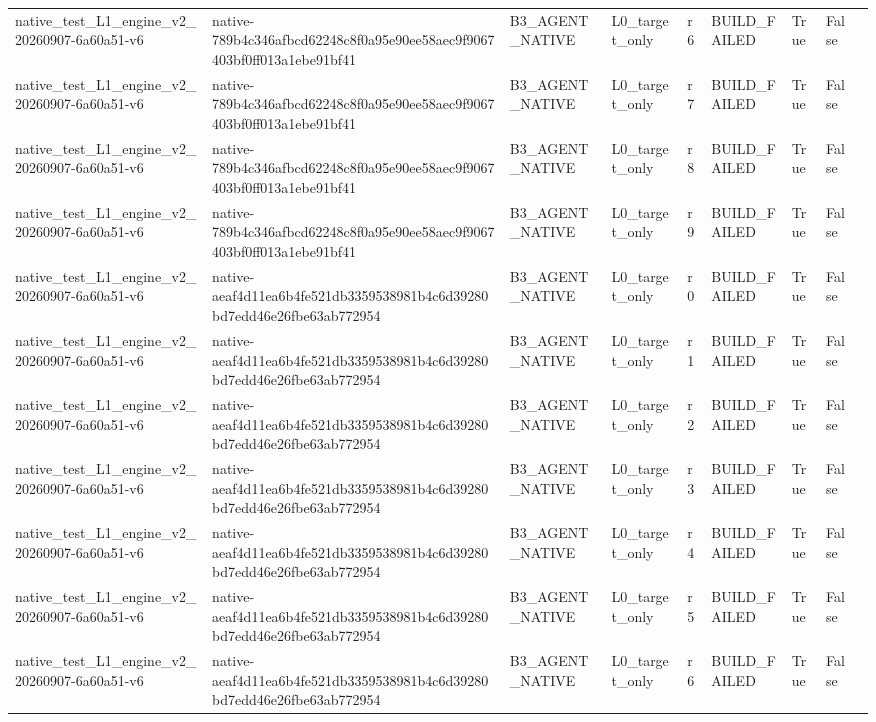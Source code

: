 \begin{tabular}{lllllllll}
native\_test\_L1\_engine\_v2\_20260907-6a60a51-v6 & native-789b4c346afbcd62248c8f0a95e90ee58aec9f9067403bf0ff013a1ebe91bf41 & B3\_AGENT\_NATIVE & L0\_target\_only & r6 & BUILD\_FAILED & True & False &  \\
native\_test\_L1\_engine\_v2\_20260907-6a60a51-v6 & native-789b4c346afbcd62248c8f0a95e90ee58aec9f9067403bf0ff013a1ebe91bf41 & B3\_AGENT\_NATIVE & L0\_target\_only & r7 & BUILD\_FAILED & True & False &  \\
native\_test\_L1\_engine\_v2\_20260907-6a60a51-v6 & native-789b4c346afbcd62248c8f0a95e90ee58aec9f9067403bf0ff013a1ebe91bf41 & B3\_AGENT\_NATIVE & L0\_target\_only & r8 & BUILD\_FAILED & True & False &  \\
native\_test\_L1\_engine\_v2\_20260907-6a60a51-v6 & native-789b4c346afbcd62248c8f0a95e90ee58aec9f9067403bf0ff013a1ebe91bf41 & B3\_AGENT\_NATIVE & L0\_target\_only & r9 & BUILD\_FAILED & True & False &  \\
native\_test\_L1\_engine\_v2\_20260907-6a60a51-v6 & native-aeaf4d11ea6b4fe521db3359538981b4c6d39280bd7edd46e26fbe63ab772954 & B3\_AGENT\_NATIVE & L0\_target\_only & r0 & BUILD\_FAILED & True & False &  \\
native\_test\_L1\_engine\_v2\_20260907-6a60a51-v6 & native-aeaf4d11ea6b4fe521db3359538981b4c6d39280bd7edd46e26fbe63ab772954 & B3\_AGENT\_NATIVE & L0\_target\_only & r1 & BUILD\_FAILED & True & False &  \\
native\_test\_L1\_engine\_v2\_20260907-6a60a51-v6 & native-aeaf4d11ea6b4fe521db3359538981b4c6d39280bd7edd46e26fbe63ab772954 & B3\_AGENT\_NATIVE & L0\_target\_only & r2 & BUILD\_FAILED & True & False &  \\
native\_test\_L1\_engine\_v2\_20260907-6a60a51-v6 & native-aeaf4d11ea6b4fe521db3359538981b4c6d39280bd7edd46e26fbe63ab772954 & B3\_AGENT\_NATIVE & L0\_target\_only & r3 & BUILD\_FAILED & True & False &  \\
native\_test\_L1\_engine\_v2\_20260907-6a60a51-v6 & native-aeaf4d11ea6b4fe521db3359538981b4c6d39280bd7edd46e26fbe63ab772954 & B3\_AGENT\_NATIVE & L0\_target\_only & r4 & BUILD\_FAILED & True & False &  \\
native\_test\_L1\_engine\_v2\_20260907-6a60a51-v6 & native-aeaf4d11ea6b4fe521db3359538981b4c6d39280bd7edd46e26fbe63ab772954 & B3\_AGENT\_NATIVE & L0\_target\_only & r5 & BUILD\_FAILED & True & False &  \\
native\_test\_L1\_engine\_v2\_20260907-6a60a51-v6 & native-aeaf4d11ea6b4fe521db3359538981b4c6d39280bd7edd46e26fbe63ab772954 & B3\_AGENT\_NATIVE & L0\_target\_only & r6 & BUILD\_FAILED & True & False &  \\

\end{tabular}

